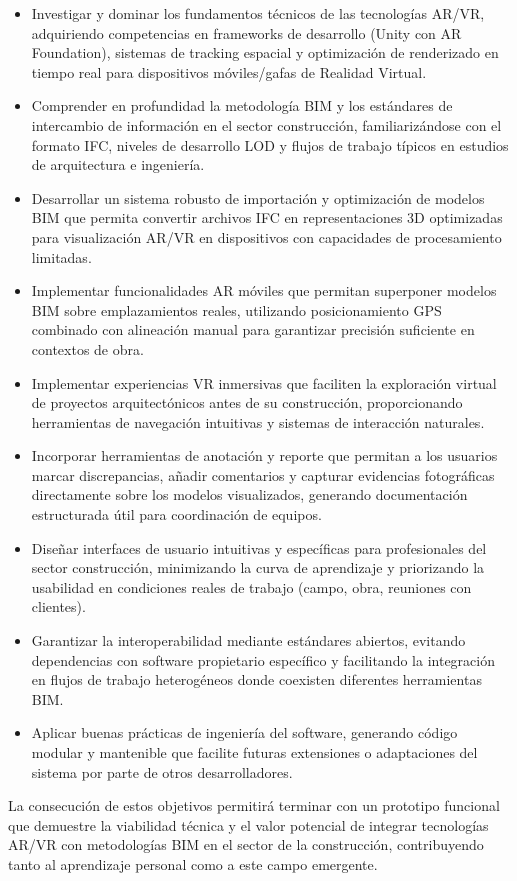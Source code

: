 \begin{itemize}
\item Investigar y dominar los fundamentos técnicos de las tecnologías AR/VR, adquiriendo competencias en frameworks de desarrollo (Unity con AR Foundation), sistemas de tracking espacial y optimización de renderizado en tiempo real para dispositivos móviles/gafas de Realidad Virtual.
\item Comprender en profundidad la metodología BIM y los estándares de intercambio de información en el sector construcción, familiarizándose con el formato IFC, niveles de desarrollo LOD y flujos de trabajo típicos en estudios de arquitectura e ingeniería.
\item Desarrollar un sistema robusto de importación y optimización de modelos BIM que permita convertir archivos IFC en representaciones 3D optimizadas para visualización AR/VR en dispositivos con capacidades de procesamiento limitadas.
\item Implementar funcionalidades AR móviles que permitan superponer modelos BIM sobre emplazamientos reales, utilizando posicionamiento GPS combinado con alineación manual para garantizar precisión suficiente en contextos de obra.
\item Implementar experiencias VR inmersivas que faciliten la exploración virtual de proyectos arquitectónicos antes de su construcción, proporcionando herramientas de navegación intuitivas y sistemas de interacción naturales.
\item Incorporar herramientas de anotación y reporte que permitan a los usuarios marcar discrepancias, añadir comentarios y capturar evidencias fotográficas directamente sobre los modelos visualizados, generando documentación estructurada útil para coordinación de equipos.
\item Diseñar interfaces de usuario intuitivas y específicas para profesionales del sector construcción, minimizando la curva de aprendizaje y priorizando la usabilidad en condiciones reales de trabajo (campo, obra, reuniones con clientes).
\item Garantizar la interoperabilidad mediante estándares abiertos, evitando dependencias con software propietario específico y facilitando la integración en flujos de trabajo heterogéneos donde coexisten diferentes herramientas BIM.
\item Aplicar buenas prácticas de ingeniería del software, generando código modular y mantenible que facilite futuras extensiones o adaptaciones del sistema por parte de otros desarrolladores.

\end{itemize}
La consecución de estos objetivos permitirá terminar con un prototipo funcional que demuestre la viabilidad técnica y el valor potencial de integrar tecnologías AR/VR con metodologías BIM en el sector de la construcción, contribuyendo tanto al aprendizaje personal como a este campo emergente.



